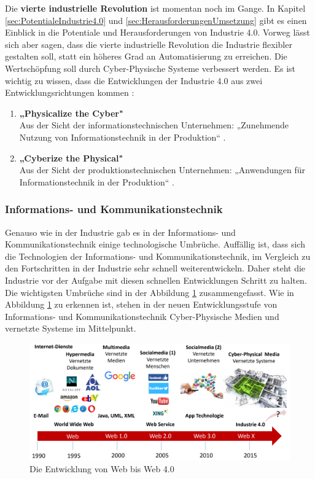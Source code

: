 \newline\newline
Die \textbf{vierte industrielle Revolution} ist momentan noch im Gange. In Kapitel \ref{sec:PotentialeIndustrie4.0} und \ref{sec:HerausforderungenUmsetzung} gibt es einen Einblick in die Potentiale und Herausforderungen von Industrie 4.0. Vorweg lässt sich aber sagen, dass die vierte industrielle Revolution die Industrie flexibler gestalten soll, statt ein höheres Grad an Automatisierung zu erreichen. Die Wertschöpfung soll durch Cyber-Physische Systeme verbessert werden. Es ist wichtig zu wissen, dass die Entwicklungen der Industrie 4.0 aus zwei Entwicklungsrichtungen kommen \cite{1}:
\begin{enumerate}
	\item \textbf{„Physicalize the Cyber"} \cite{1} \\ Aus der Sicht der informationstechnischen Unternehmen: „Zunehmende Nutzung von Informationstechnik in der Produktion“ \cite{1}.
	\item \textbf{„Cyberize the Physical"} \cite{1} \\ Aus der Sicht der produktionstechnischen Unternehmen: „Anwendungen für Informationstechnik in der Produktion“ \cite{1}.
\end{enumerate}

\subsubsection{Informations- und Kommunikationstechnik}\label{sec:WebRevolution}
Genauso wie in der Industrie gab es in der Informations- und Kommunikationstechnik einige technologische Umbrüche. Auffällig ist, dass sich die Technologien der Informations- und Kommunikationstechnik, im Vergleich zu den Fortschritten in der Industrie sehr schnell weiterentwickeln. Daher steht die Industrie vor der Aufgabe mit diesen schnellen Entwicklungen Schritt zu halten. Die wichtigsten Umbrüche sind in der Abbildung \ref{fig:WebRevolutionBild} zusammengefasst. Wie in Abbildung \ref{fig:WebRevolutionBild} zu erkennen ist, stehen in der neuen Entwicklungsstufe von Informations- und Kommunikationstechnik Cyber-Physische Medien und vernetzte Systeme im Mittelpunkt.
\begin{figure}[h]
	\centering
	\includegraphics[width=1\linewidth]{Bilder/A2_EntwicklungWeb0-4}
	\caption{Die Entwicklung von Web bis Web 4.0 \cite{A2}}
	\label{fig:WebRevolutionBild}
\end{figure}

